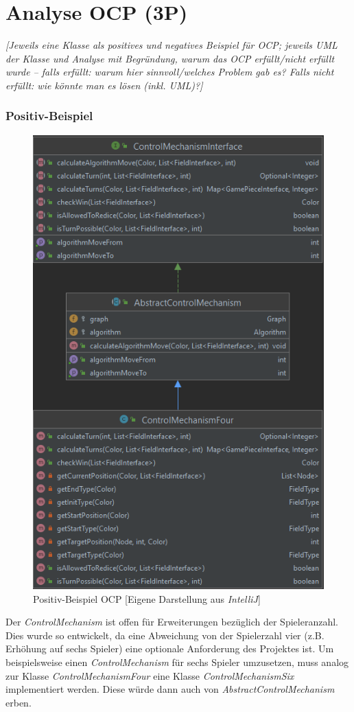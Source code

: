 \newpage
\noindent

\section{Analyse OCP (3P)}
\emph{[Jeweils eine Klasse als positives und negatives Beispiel für OCP; jeweils UML der Klasse und
Analyse mit Begründung, warum das OCP erfüllt/nicht erfüllt wurde – falls erfüllt: warum hier
sinnvoll/welches Problem gab es? Falls nicht erfüllt: wie könnte man es lösen (inkl. UML)?]}
\subsubsection{Positiv-Beispiel}
\begin{figure}[htbp]
\centering
\centerline{\includegraphics[scale=.5]{positivbeispiel_ocp}}
\caption{Positiv-Beispiel OCP [Eigene Darstellung aus \emph{IntelliJ}]}
\label{fig:positivbeispiel_ocp}
\end{figure}
\noindent Der \emph{ControlMechanism} ist offen für Erweiterungen bezüglich der Spieleranzahl. Dies wurde so entwickelt, da eine Abweichung von der Spielerzahl vier (z.B. Erhöhung auf sechs Spieler) eine optionale Anforderung des Projektes ist.
\newpage
\noindent Um beispielsweise einen \emph{ControlMechanism} für sechs Spieler umzusetzen, muss analog zur Klasse \emph{ControlMechanismFour} eine Klasse \emph{ControlMechanismSix} implementiert werden. Diese würde dann auch von \emph{AbstractControlMechanism} erben. 

